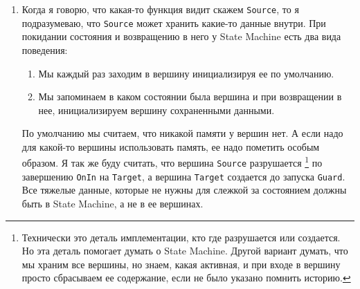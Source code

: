 \documentclass{article}
\begin{document}
{\begin{enumerate}
\begin{enumerate}
\item \verb"Action" -- функция, которая видит:  \verb"Source", \verb"Target" и \verb"Trigger" (и возможно еще некоторые данные, которые видны всем методам State Machine), которая выполняется при переходе по ребру.
Данная функция у каждого ребра вообще говоря своя.

\item \verb"OnOut" -- функция, которая видит:%
\footnote{\label{ref::InOutNonStandard}
В оригинальной версии это действие должно еще видеть \texttt{Target} и \texttt{Trigger}, но тогда теряется логический смысл, что это действие не зависит от ребра.
Банально сообщения имеют разный тип и для обработки скажем \texttt{Trigger} нам все равно придется делать перебор по разным типам сообщений, что означает, что это скорее всего действие в рамках \texttt{Action}, которое видит все и зависит от ребра.}
\verb"Source" (и возможно еще некоторые данные, которые видны всем методам State Machine), и выполняется при выходе из \verb"Source" независимо от ребра.
Она выполняется до \verb"Action", но после \verb"Guard".

\item \verb"OnIn" -- функция, которая видит:%
\textsuperscript{\ref{ref::InOutNonStandard}}
\verb"Source" (и возможно еще некоторые данные, которые видны всем методам State Machine), и выполняется при входе в \verb"Target" независимо от ребра.
Она выполняется после \verb"Action".
\end{enumerate}

\item Когда я говорю, что какая-то функция видит скажем \verb"Source", то я подразумеваю, что \verb"Source" может хранить какие-то данные внутри.
При покидании состояния и возвращению в него у State Machine есть два вида поведения:
\begin{enumerate}
\item Мы каждый раз заходим в вершину инициализируя ее по умолчанию.

\item Мы запоминаем в каком состоянии была вершина и при возвращении в нее, инициализируем вершину сохраненными данными.
\end{enumerate}
По умолчанию мы считаем, что никакой памяти у вершин нет.
А если надо для какой-то вершины использовать память, ее надо пометить особым образом.
Я так же буду считать, что вершина \verb"Source" разрушается%
\footnote{Технически это деталь имплементации, кто где разрушается или создается.
Но эта деталь помогает думать о State Machine.
Другой вариант думать, что мы храним все вершины, но знаем, какая активная, и при входе в вершину просто сбрасываем ее содержание, если не было указано помнить историю.}
по завершению \verb"OnIn" на \verb"Target", а вершина \verb"Target" создается до запуска \verb"Guard".
Все тяжелые данные, которые не нужны для слежкой за состоянием должны быть в State Machine, а не в ее вершинах.
\end{enumerate}

}
\end{document}
